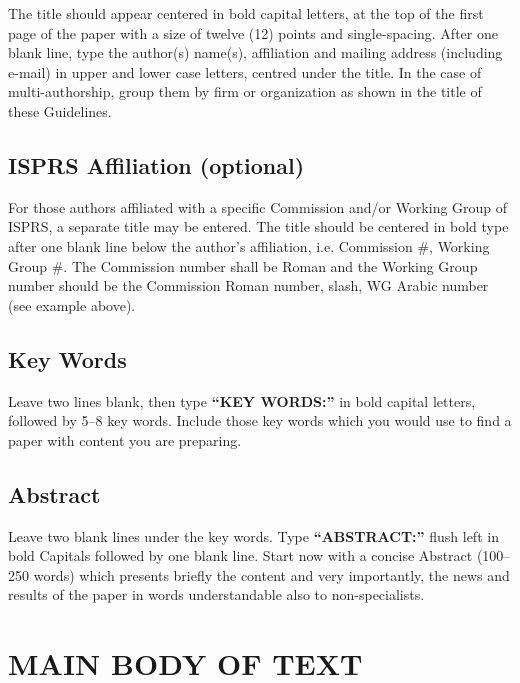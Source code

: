 \documentclass{isprs} %
\begin{document}
The title should appear centered in bold capital letters, at the top of the 
first page of the paper with a size of twelve (12) points and single-spacing. 
After one blank line, type the author(s) name(s), affiliation and mailing address 
(including e-mail) in upper and lower case letters, centred under the title. In the 
case of multi-authorship, group them by firm or organization as shown in the title 
of these Guidelines. 

\subsection{ISPRS Affiliation (optional)}\label{sec:ISPRS Affiliation (optional)}

For those authors affiliated with a specific Commission and/or Working Group of 
ISPRS, a separate title may be entered. The title should be centered in bold type 
after one blank line below the author's affiliation, i.e. Commission \#, Working Group \#. 
The Commission number shall be Roman and the Working Group number should be the Commission 
Roman number, slash, WG Arabic number (see example above).


\subsection{Key Words}\label{sec:Key Words}

Leave two lines blank, then type \textbf{``KEY WORDS:''}
in bold capital letters, followed by 5--8 key words. Include those key words which you would 
use to find a paper with content you are preparing.


\subsection{Abstract}\label{sec:Abstract}

Leave two blank lines under the key words. Type \textbf{``ABSTRACT:''}
flush left in bold Capitals followed by one blank line. Start now
with a concise Abstract (100--250 words) which presents briefly the
content and very importantly, the news and results of the paper in
words understandable also to non-specialists. 


\section{MAIN BODY OF TEXT}\label{sec:MAIN BODY OF TEXT}
\end{document}
